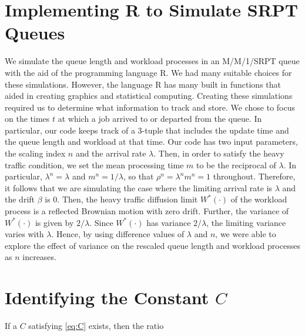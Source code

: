 \documentclass[12pt]{article}
\theoremstyle{plain}
\theoremstyle{definition}
\theoremstyle{remark}
\begin{document}
\section{Implementing R to Simulate SRPT Queues}

We simulate the queue length and workload processes in an M/M/1/SRPT queue with the aid of the programming language R.  We had many suitable choices for these simulations.  However, the language R has many built in
functions that aided in creating graphics and statistical computing.   Creating these simulations required us to
determine what information to track and store.  We chose to focus on the times $t$ at which a job arrived to or
departed from the queue. In particular, our code keeps track of a 3-tuple that includes the update time and the
queue length and workload at that time.
Our code has two input parameters, the scaling index $n$ and the arrival rate $\lambda$.  Then,
in order to satisfy the heavy traffic condition, we set the mean processing time $m$ to be the reciprocal of
$\lambda$.  In particular, $\lambda^n=\lambda$ and $m^n=1/\lambda$, so that $\rho^n=\lambda^nm^n=1$ throughout.  Therefore, it follows that we are simulating the case where the limiting arrival rate is $\lambda$ and the drift $\beta$ is 0.
Then, the heavy traffic diffusion limit $W^*(\cdot)$ of the workload process is a reflected Brownian motion with zero drift. 
Further, the variance of $W^*(\cdot)$ is given by $2/\lambda$.
Since $W^*(\cdot)$ has variance
$2/\lambda$,
the limiting variance varies with $\lambda$.  Hence, by using difference values of $\lambda$ and $n$, we were
able to explore the effect of variance on the rescaled queue length and workload processes as $n$ increases.



\section{Identifying the Constant $C$}\label{sec:ratio}

If a $C$ satisfying \eqref{eq:C} exists, then the ratio
\end{document}
